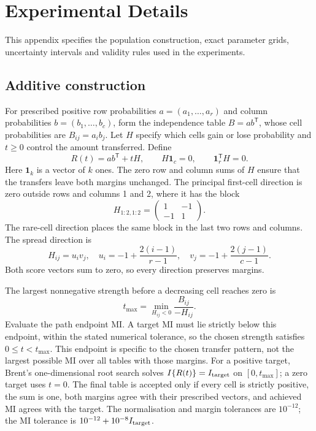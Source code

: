 \chapter{Experimental Details}
\label{app:construction}

This appendix specifies the population construction, exact parameter grids,
uncertainty intervals and validity rules used in the experiments.

\section{Additive construction}

For prescribed positive row probabilities \(a=(a_1,\ldots,a_r)\) and
column probabilities \(b=(b_1,\ldots,b_c)\), form the independence table
\(B=ab^{\mathsf T}\), whose cell probabilities are \(B_{ij}=a_i b_j\).
Let \(H\) specify which cells gain or lose probability and \(t\ge0\)
control the amount transferred. Define
\begin{equation}
 R(t)=ab^{\mathsf T}+tH,
 \qquad H\mathbf{1}_c=0,
 \qquad \mathbf{1}_r^{\mathsf T}H=0.
 \label{eq:additive-construction}
\end{equation}
Here \(\mathbf{1}_k\) is a vector of \(k\) ones. The zero row and column
sums of \(H\) ensure that the transfers leave both margins unchanged.
The principal first-cell direction is zero outside rows and columns 1
and 2, where it has the block
\begin{equation}
 H_{1:2,1:2}=\begin{pmatrix}1&-1\\-1&1\end{pmatrix}.
 \label{eq:first-change-block}
\end{equation}
The rare-cell direction places the same block in the last two rows and
columns. The spread direction is
\begin{equation}
 H_{ij}=u_i v_j,
 \quad u_i=-1+\frac{2(i-1)}{r-1},
 \quad v_j=-1+\frac{2(j-1)}{c-1}.
 \label{eq:appendix-spread}
\end{equation}
Both score vectors sum to zero, so every direction preserves margins.

The largest nonnegative strength before a decreasing cell reaches zero is
\begin{equation}
 t_{\max}=\min_{H_{ij}<0}\frac{B_{ij}}{-H_{ij}}.
 \label{eq:design-tmax}
\end{equation}
Evaluate the path endpoint MI\@. A target MI must lie strictly below this
endpoint, within the stated numerical tolerance, so the chosen strength
satisfies \(0\le t<t_{\max}\). This endpoint is specific to the chosen
transfer pattern, not the largest possible MI over all tables with those
margins. For a positive target,
Brent's one-dimensional root search \citep{brent1973} solves \(I\{R(t)\}=I_{\rm target}\)
on \([0,t_{\max}]\); a zero target uses \(t=0\). The final table is accepted
only if every cell is strictly positive, the sum is one, both margins agree
with their prescribed vectors, and achieved MI agrees with the target. The
normalisation and margin tolerances are \(10^{-12}\); the MI tolerance is
\(10^{-12}+10^{-8}I_{\rm target}\).

